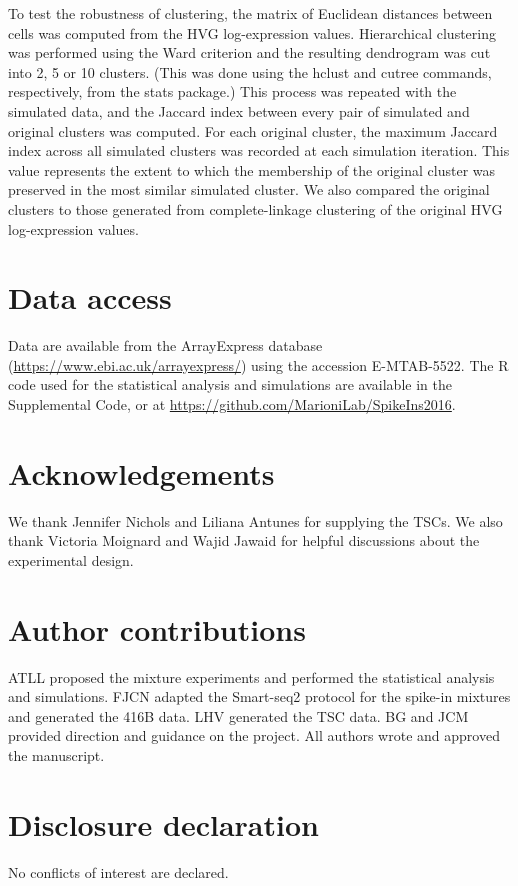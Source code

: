 \documentclass{article}
\begin{document}
To test the robustness of clustering, the matrix of Euclidean distances between cells was computed from the HVG log-expression values. 
Hierarchical clustering was performed using the Ward criterion and the resulting dendrogram was cut into 2, 5 or 10 clusters.
(This was done using the hclust and cutree commands, respectively, from the stats package.)
This process was repeated with the simulated data, and the Jaccard index between every pair of simulated and original clusters was computed.
For each original cluster, the maximum Jaccard index across all simulated clusters was recorded at each simulation iteration.
This value represents the extent to which the membership of the original cluster was preserved in the most similar simulated cluster.
We also compared the original clusters to those generated from complete-linkage clustering of the original HVG log-expression values.

\section*{Data access}
Data are available from the ArrayExpress database (\url{https://www.ebi.ac.uk/arrayexpress/}) using the accession E-MTAB-5522.
The R code used for the statistical analysis and simulations are available in the Supplemental Code, or at \url{https://github.com/MarioniLab/SpikeIns2016}.

\section*{Acknowledgements}
We thank Jennifer Nichols and Liliana Antunes for supplying the TSCs.
We also thank Victoria Moignard and Wajid Jawaid for helpful discussions about the experimental design.

\section*{Author contributions}
ATLL proposed the mixture experiments and performed the statistical analysis and simulations.
FJCN adapted the Smart-seq2 protocol for the spike-in mixtures and generated the 416B data.
LHV generated the TSC data.
BG and JCM provided direction and guidance on the project.
All authors wrote and approved the manuscript.

\section*{Disclosure declaration}
No conflicts of interest are declared.
\end{document}
